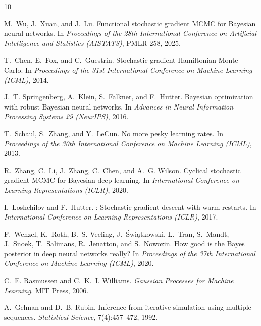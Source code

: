\documentclass[11pt]{article}
\begin{document}
\begin{thebibliography}{10}

M.~Wu, J.~Xuan, and J.~Lu.
\newblock Functional stochastic gradient {MCMC} for {B}ayesian neural
  networks.
\newblock In \emph{Proceedings of the 28th International Conference on
  Artificial Intelligence and Statistics (AISTATS)}, PMLR 258, 2025.

T.~Chen, E.~Fox, and C.~Guestrin.
\newblock Stochastic gradient {H}amiltonian {M}onte {C}arlo.
\newblock In \emph{Proceedings of the 31st International Conference on
  Machine Learning (ICML)}, 2014.

J.~T. Springenberg, A.~Klein, S.~Falkner, and F.~Hutter.
\newblock Bayesian optimization with robust {B}ayesian neural networks.
\newblock In \emph{Advances in Neural Information Processing Systems 29
  (NeurIPS)}, 2016.

T.~Schaul, S.~Zhang, and Y.~LeCun.
\newblock No more pesky learning rates.
\newblock In \emph{Proceedings of the 30th International Conference on
  Machine Learning (ICML)}, 2013.

R.~Zhang, C.~Li, J.~Zhang, C.~Chen, and A.~G. Wilson.
\newblock Cyclical stochastic gradient {MCMC} for {B}ayesian deep learning.
\newblock In \emph{International Conference on Learning Representations
  (ICLR)}, 2020.

I.~Loshchilov and F.~Hutter.
: Stochastic gradient descent with warm restarts.
\newblock In \emph{International Conference on Learning Representations
  (ICLR)}, 2017.

F.~Wenzel, K.~Roth, B.~S. Veeling, J.~{\'S}wi{\k{a}}tkowski, L.~Tran,
  S.~Mandt, J.~Snoek, T.~Salimans, R.~Jenatton, and S.~Nowozin.
\newblock How good is the {B}ayes posterior in deep neural networks really?
\newblock In \emph{Proceedings of the 37th International Conference on
  Machine Learning (ICML)}, 2020.

C.~E. Rasmussen and C.~K.~I. Williams.
\newblock \emph{Gaussian Processes for Machine Learning}.
\newblock MIT Press, 2006.

A.~Gelman and D.~B. Rubin.
\newblock Inference from iterative simulation using multiple sequences.
\newblock \emph{Statistical Science}, 7(4):457--472, 1992.

\end{thebibliography}
\end{document}

